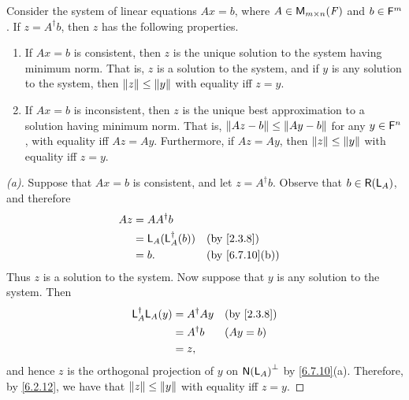 \begin{thm}\label{6.30}
  Consider the system of linear equations \(Ax = b\), where \(A \in \ms\) and \(b \in \mathsf{F}^m\).
  If \(z = A^{\dag} b\), then \(z\) has the following properties.
  \begin{enumerate}
    \item If \(Ax = b\) is consistent, then \(z\) is the unique solution to the system having minimum norm.
          That is, \(z\) is a solution to the system, and if \(y\) is any solution to the system, then \(\left\lVert z\right\rVert \leq \left\lVert y\right\rVert\) with equality iff \(z = y\).
    \item If \(Ax = b\) is inconsistent, then \(z\) is the unique best approximation to a solution having minimum norm.
          That is, \(\left\lVert Az - b\right\rVert \leq \left\lVert Ay - b\right\rVert\) for any \(y \in \mathsf{F}^n\), with equality iff \(Az = Ay\).
          Furthermore, if \(Az = Ay\), then \(\left\lVert z\right\rVert \leq \left\lVert y\right\rVert\) with equality iff \(z = y\).
  \end{enumerate}
\end{thm}

\begin{proof}[(a)]
  Suppose that \(Ax = b\) is consistent, and let \(z = A^{\dag} b\).
  Observe that \(b \in \rg{\L_A}\), and therefore
  \begin{align*}
    Az & = A A^{\dag} b                             \\
       & = \L_A(\L_A^{\dag}(b)) &  & \by{2.3.8}     \\
       & = b.                   &  & \by{6.7.10}[b]
  \end{align*}
  Thus \(z\) is a solution to the system.
  Now suppose that \(y\) is any solution to the system.
  Then
  \begin{align*}
    \L_A^{\dag} \L_A(y) & = A^{\dag} A y &  & \by{2.3.8} \\
                        & = A^{\dag} b   &  & (Ay = b)   \\
                        & = z,
  \end{align*}
  and hence \(z\) is the orthogonal projection of \(y\) on \(\ns{\L_A}^{\perp}\) by \cref{6.7.10}(a).
  Therefore, by \cref{6.2.12}, we have that \(\left\lVert z\right\rVert \leq \left\lVert y\right\rVert\) with equality iff \(z = y\).
\end{proof}

